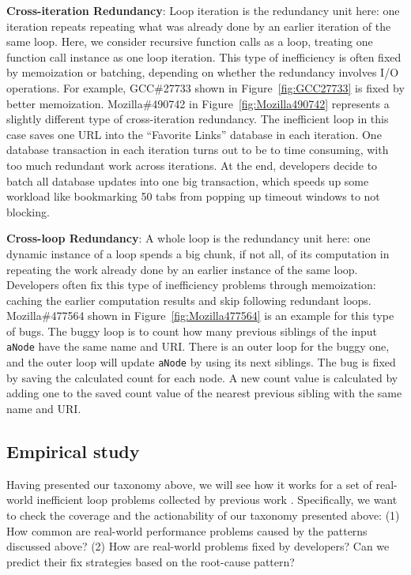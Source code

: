 {\textbf{Cross-iteration Redundancy}}:
Loop iteration is the redundancy unit here:
one iteration repeats
repeating what was already done by an earlier iteration of the same loop.
Here, we consider recursive function calls as a loop, treating one function 
call instance as one loop iteration. 
This type of inefficiency is often fixed by memoization or batching, depending
on whether the redundancy involves I/O operations.
For example, GCC\#27733 shown in Figure~\ref{fig:GCC27733} 
is fixed by better memoization. 
Mozilla\#490742 in Figure~\ref{fig:Mozilla490742} represents a slightly different type of cross-iteration
redundancy. The inefficient loop in this case saves one URL into the ``Favorite
Links'' database in each iteration. One database transaction in each iteration
turns out to be to time consuming, with too much redundant work across
iterations. At the end, developers decide to batch all database updates into 
one big transaction, which speeds up some workload like 
bookmarking 50 tabs 
from popping up timeout windows to not blocking.

{\textbf{Cross-loop Redundancy}}:
A whole loop is the redundancy unit here:
one dynamic instance of a loop spends a big chunk, if not all, of its
computation in repeating the work already done by an
earlier instance of the same loop.
Developers often fix this type of inefficiency problems through memoization:
caching the earlier computation results and skip following redundant loops.
Mozilla\#477564 shown in Figure~\ref{fig:Mozilla477564} is an example for this type of bugs. 
The buggy loop is to count how many previous siblings of the input \texttt{aNode} have the same name and URI. 
There is an outer loop for the buggy one, and the outer loop will update \texttt{aNode} by using its next siblings. 
The bug is fixed by saving the calculated count for each node. 
A new count value is calculated by adding one to the saved count value of the nearest previous sibling with the same name and URI.


\subsection{Empirical study}
\label{sec:tax_study}
Having presented our taxonomy above, we will see how it works for a set of
real-world inefficient loop problems collected by previous work
\citep{SongOOPSLA2014,PerfBug}. Specifically, we want to check the 
coverage and the actionability of our taxonomy presented above:
(1) How common are real-world performance problems caused by the 
patterns discussed above?
(2) How are real-world problems fixed by developers? Can we predict their
fix strategies based on the root-cause pattern?

